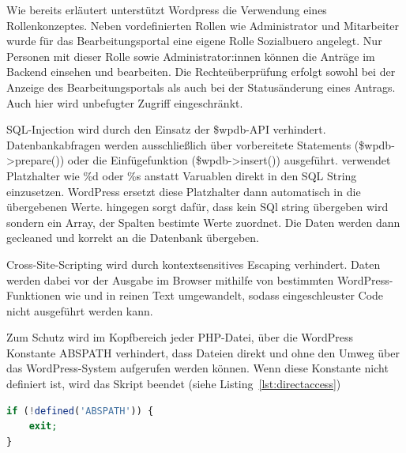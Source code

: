 Wie bereits erläutert unterstützt Wordpress die Verwendung eines Rollenkonzeptes. Neben vordefinierten Rollen wie \glqq{}Administrator\grqq{} und \glqq{}Mitarbeiter\grqq{} wurde für das Bearbeitungsportal eine eigene Rolle \glqq{}Sozialbuero\grqq{} angelegt. Nur Personen mit dieser Rolle sowie Administrator:innen können die Anträge im Backend einsehen und bearbeiten. Die Rechteüberprüfung erfolgt sowohl bei der Anzeige des Bearbeitungsportals als auch bei der Statusänderung eines Antrags. Auch hier wird unbefugter Zugriff eingeschränkt. 

SQL-Injection wird durch den Einsatz der \$wpdb-API verhindert. Datenbankabfragen werden ausschließlich über vorbereitete Statements (\$wpdb->prepare()) oder die Einfügefunktion (\$wpdb->insert()) ausgeführt.  verwendet Platzhalter wie \%d oder \%s anstatt Varuablen direkt in den SQL String einzusetzen. WordPress ersetzt diese Platzhalter dann automatisch in die übergebenen Werte.  hingegen sorgt dafür, dass kein SQl string übergeben wird sondern ein Array, der Spalten bestimte Werte zuordnet. Die Daten werden dann gecleaned und korrekt an die Datenbank übergeben. 

Cross-Site-Scripting wird durch kontextsensitives Escaping verhindert. Daten werden dabei vor der Ausgabe im Browser mithilfe von bestimmten WordPress-Funktionen wie  und  in reinen Text umgewandelt, sodass eingeschleuster Code nicht ausgeführt werden kann. 

Zum Schutz wird im Kopfbereich jeder PHP-Datei, über die WordPress Konstante ABSPATH verhindert, dass Dateien direkt und ohne den Umweg über das WordPress-System aufgerufen werden können. Wenn diese Konstante nicht definiert ist, wird das Skript beendet (siehe Listing~\ref{lst:directaccess}) \\

\begin{lstlisting}[caption={PHP-Code zum Schutz vor direktem Dateizugriff},label={lst:directaccess},language=PHP]
if (!defined('ABSPATH')) {
    exit;
}
\end{lstlisting}
